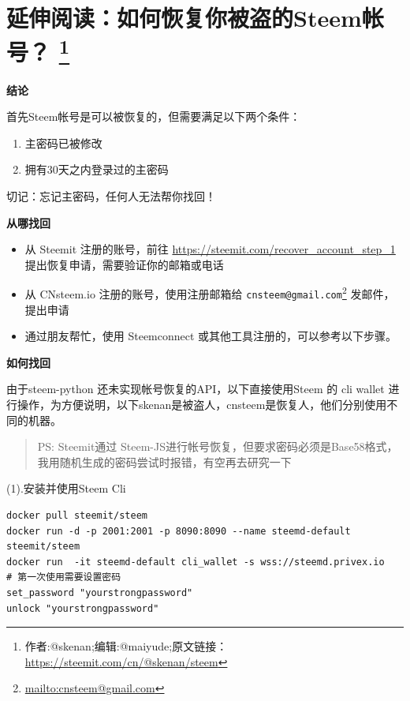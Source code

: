 \documentclass[]{ctexbook}
\providecommand{\tightlist}{%
  \setlength{\itemsep}{0pt}\setlength{\parskip}{0pt}}
\renewcommand{\href}[2]{#2\footnote{\url{#1}}}
\begin{document}
\hypertarget{how-to-recover-your-key}{%
\section[延伸阅读：如何恢复你被盗的Steem帐号？ ]{\texorpdfstring{延伸阅读：如何恢复你被盗的Steem帐号？ \footnote{作者:@skenan;编辑:@maiyude;原文链接：\url{https://steemit.com/cn/@skenan/steem}}}{延伸阅读：如何恢复你被盗的Steem帐号？ }}\label{how-to-recover-your-key}}

\textbf{结论}

首先Steem帐号是可以被恢复的，但需要满足以下两个条件：

\begin{enumerate}
\def\labelenumi{\arabic{enumi}.}
\tightlist
\item
  主密码已被修改
\item
  拥有30天之内登录过的主密码
\end{enumerate}

切记：忘记主密码，任何人无法帮你找回！

\textbf{从哪找回}

\begin{itemize}
\tightlist
\item
  从 Steemit 注册的账号，前往 \url{https://steemit.com/recover_account_step_1} 提出恢复申请，需要验证你的邮箱或电话
\item
  从 CNsteem.io 注册的账号，使用注册邮箱给 \href{mailto:cnsteem@gmail.com}{\nolinkurl{cnsteem@gmail.com}} 发邮件，提出申请
\item
  通过朋友帮忙，使用 Steemconnect 或其他工具注册的，可以参考以下步骤。
\end{itemize}

\textbf{如何找回}

由于steem-python 还未实现帐号恢复的API，以下直接使用Steem 的 cli wallet 进行操作，为方便说明，以下skenan是被盗人，cnsteem是恢复人，他们分别使用不同的机器。

\begin{quote}
PS: Steemit通过 Steem-JS进行帐号恢复，但要求密码必须是Base58格式，我用随机生成的密码尝试时报错，有空再去研究一下
\end{quote}

(1).安装并使用Steem Cli

\begin{verbatim}
docker pull steemit/steem
docker run -d -p 2001:2001 -p 8090:8090 --name steemd-default steemit/steem
docker run  -it steemd-default cli_wallet -s wss://steemd.privex.io
# 第一次使用需要设置密码
set_password "yourstrongpassword"
unlock "yourstrongpassword"
\end{verbatim}
\end{document}
